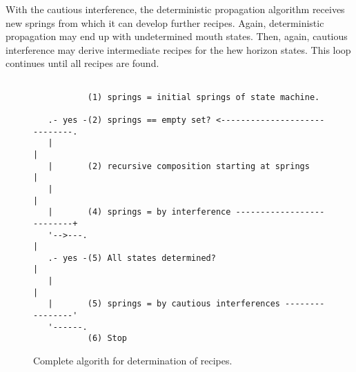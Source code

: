 \documentclass[12pt,a4paper]{scrartcl}
\begin{document}
With the cautious interference, the deterministic propagation algorithm
receives new springs from which it can develop further recipes. Again, deterministic
propagation may end up with undetermined mouth states. Then, again, cautious
interference may derive intermediate recipes for the hew horizon states. This
loop continues until all recipes are found. 


\begin{figure}[htbp] \leavevmode \label{fig:algo-2}
\begin{verbatim}
   
           (1) springs = initial springs of state machine.

   .- yes -(2) springs == empty set? <-----------------------------.
   |                                                               |
   |       (2) recursive composition starting at springs          |
   |                                                               |
   |       (4) springs = by interference --------------------------+
   '-->---.                                                        |
   .- yes -(5) All states determined?                              |
   |                                                               |
   |       (5) springs = by cautious interferences ----------------'
   '------.
           (6) Stop 

\end{verbatim}

\caption{Complete algorith for determination of recipes.}
\end{figure}
\end{document}
